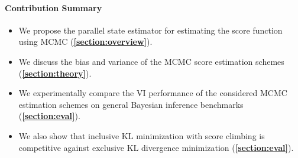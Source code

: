 

\paragraph{Contribution Summary}
\begin{itemize}[noitemsep]
\item[\ding{228}] We propose the parallel state estimator for estimating the score function using MCMC (\textbf{\cref{section:overview}}).
\item[\ding{228}] We discuss the bias and variance of the MCMC score estimation schemes (\textbf{\cref{section:theory}}).
\item[\ding{228}] We experimentally compare the VI performance of the considered MCMC estimation schemes on general Bayesian inference benchmarks (\textbf{\cref{section:eval}}).
\item[\ding{228}] We also show that inclusive KL minimization with score climbing is competitive against exclusive KL divergence minimization (\textbf{\cref{section:eval}}).
\end{itemize}


